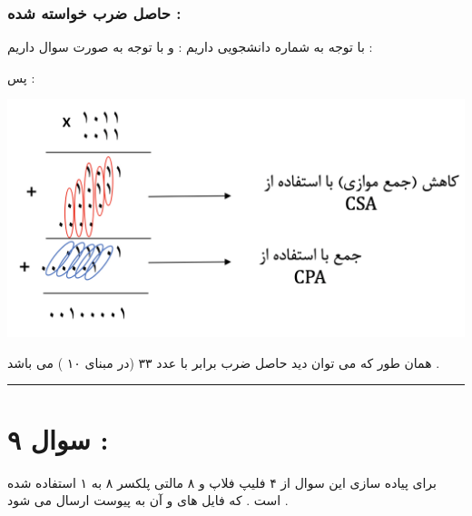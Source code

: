 \documentclass{article}
\begin{document}
\subsubsection*{حاصل ضرب خواسته شده  : }
با توجه به شماره دانشجویی داریم  : 
و با توجه به صورت سوال داریم  : 

پس  : 
\begin{center}
	\includegraphics[width=1\textwidth]{wallace}
\end{center}
همان طور که می توان دید حاصل ضرب برابر با عدد ۳۳ (در مبنای ۱۰ ) می باشد . 
\hrule
\section*{سوال ۹ : }
برای پیاده سازی این سوال از ۴ فلیپ فلاپ 
و ۸ مالتی پلکسر ۸ به ۱ استفاده شده است . که فایل های 
و 
آن به پیوست ارسال می شود  .
\end{document}
